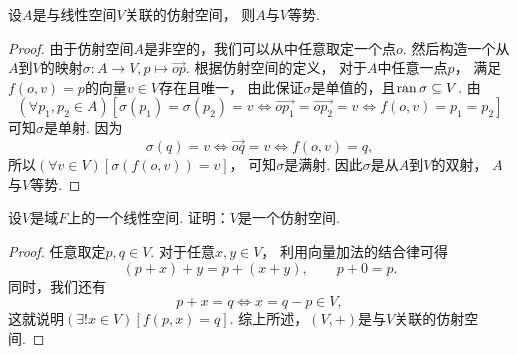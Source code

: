 \begin{proposition}\label{theorem:仿射空间.仿射空间与线性空间等势}
设\(A\)是与线性空间\(V\)关联的仿射空间，
则\(A\)与\(V\)等势.
\begin{proof}
由于仿射空间\(A\)是非空的，我们可以从中任意取定一个点\(o\).
然后构造一个从\(A\)到\(V\)的映射\(\sigma\colon A \to V, p \mapsto \vec{op}\).
根据仿射空间的定义，
对于\(A\)中任意一点\(p\)，
满足\(f(o,v) = p\)的向量\(v \in V\)存在且唯一，
由此保证\(\sigma\)是单值的，且\(\operatorname{ran}\sigma \subseteq V\).
由\begin{equation*}
	(\forall p_1,p_2 \in A)
	[
		\sigma(p_1) = \sigma(p_2) = v
		\iff
		\vec{op_1} = \vec{op_2} = v
		\iff
		f(o,v) = p_1 = p_2
	]
\end{equation*}
可知\(\sigma\)是单射.
因为\begin{equation*}
	\sigma(q) = v
	\iff  %
	\vec{oq} = v
	\iff  %
	f(o,v) = q,
\end{equation*}
所以\(
	(\forall v \in V)
	[
		\sigma(f(o,v)) = v
	]
\)，
可知\(\sigma\)是满射.
因此\(\sigma\)是从\(A\)到\(V\)的双射，
\(A\)与\(V\)等势.
\end{proof}
\end{proposition}

\begin{example}
设\(V\)是域\(F\)上的一个线性空间.
证明：\(V\)是一个仿射空间.
\begin{proof}
任意取定\(p,q \in V\).
对于任意\(x,y \in V\)，
利用向量加法的结合律可得\begin{equation*}
	(p + x) + y
	= p + (x + y),
	\qquad
	p + 0
	= p.
\end{equation*}
同时，我们还有\begin{equation*}
	p + x = q
	\iff
	x = q - p \in V,
\end{equation*}
这就说明\(
	(\exists! x \in V)
	[
		f(p,x) = q
	]
\).
综上所述，\((V,+)\)是与\(V\)关联的仿射空间.
\end{proof}
\end{example}

